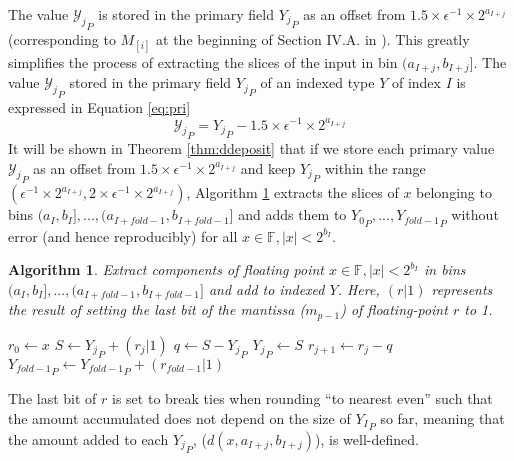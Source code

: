 \documentclass[12pt]{article}
\providecommand{\F}{\ensuremath{\mathbb{F}}}
\theoremstyle{plain}
\newtheorem{alg}{Algorithm}[section]
\begin{document}
      The value ${\mathcal{Y}_j}_P$ is stored in the primary field ${Y_j}_P$ as an offset from $1.5\times \epsilon^{-1} \times 2^{a_{I + j}}$ (corresponding to $M_{[i]}$ at the beginning of Section IV.A. in \cite{repsum}). This greatly simplifies the process of extracting the slices of the input in bin $(a_{I + j}, b_{I + j}]$.
      The value ${\mathcal{Y}_j}_P$ stored in the primary field ${Y_j}_P$ of an indexed type $Y$ of index $I$ is expressed in Equation \ref{eq:pri}
      \begin{equation}
        {\mathcal{Y}_j}_P = {Y_j}_P - 1.5\times\epsilon^{-1}\times2^{a_{I + j}}
        \label{eq:pri}
      \end{equation}
      It will be shown in Theorem \ref{thm:ddeposit} that if we store each primary value ${\mathcal{Y}_j}_P$ as an offset from $1.5 \times \epsilon^{-1} \times 2^{a_{I + j}}$ and keep ${Y_j}_P$ within the range $(\epsilon^{-1} \times 2^{a_{I + j}}, 2 \times \epsilon^{-1} \times 2^{a_{I + j}})$, Algorithm \ref{alg:deposit} extracts the slices of $x$ belonging to bins $(a_I, b_I], ..., (a_{I + fold - 1}, b_{I + fold - 1}]$ and adds them to ${Y_0}_P, ..., {Y_{fold - 1}}_P$ without error (and hence reproducibly) for all $x \in \F, |x| < 2^{b_I}$.
      \begin{alg}
        Extract components of floating point $x \in \F, |x| < 2^{b_I}$ in bins $(a_I, b_I], ..., (a_{I + fold - 1}, b_{I + fold - 1}]$ and add to indexed $Y$. Here, $(r | 1)$ represents the result of setting the last bit of the mantissa ($m_{p - 1}$) of floating-point $r$ to 1.
        \begin{algorithmic}[1]
            \State $r_0 \gets x$ \label{alg:deposit:rgetsx}
             \label{alg:deposit:loop}
              \State $S \gets {Y_j}_P + (r_j | 1)$ \label{alg:deposit:split}
              \State $q \gets S - {Y_j}_P$
              \State ${Y_j}_P \gets S$
              \State $r_{j + 1} \gets r_j - q$\label{alg:deposit:endsplit}
            \EndFor
            \State ${Y_{fold - 1}}_P \gets {Y_{fold - 1}}_P + (r_{fold - 1} | 1)$
          \EndFunction
        \end{algorithmic}
        \label{alg:deposit}
      \end{alg}
      The last bit of $r$ is set to break ties when rounding ``to nearest even'' such that the amount accumulated does not depend on the size of ${Y_I}_P$ so far, meaning that the amount added to each ${Y_j}_P$, ($d(x, a_{I + j}, b_{I + j})$), is well-defined.
\end{document}
